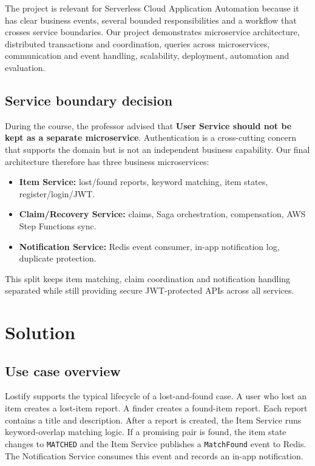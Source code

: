 \documentclass[11pt,a4paper]{article}
\begin{document}
The project is relevant for Serverless Cloud Application Automation because it has clear
business events, several bounded responsibilities and a workflow that crosses service boundaries.
Our project demonstrates microservice architecture, distributed transactions and coordination,
queries across microservices, communication and event handling, scalability, deployment,
automation and evaluation.

\subsection{Service boundary decision}

During the course, the professor advised that \textbf{User Service should not be kept as a separate
microservice}. Authentication is a cross-cutting concern that supports the domain but is not an
independent business capability. Our final architecture therefore has three business microservices:

\begin{itemize}
    \item \textbf{Item Service:} lost/found reports, keyword matching, item states, register/login/JWT.
    \item \textbf{Claim/Recovery Service:} claims, Saga orchestration, compensation, AWS Step Functions sync.
    \item \textbf{Notification Service:} Redis event consumer, in-app notification log, duplicate protection.
\end{itemize}

This split keeps item matching, claim coordination and notification handling separated while
still providing secure JWT-protected APIs across all services.

\section{Solution}

\subsection{Use case overview}

Lostify supports the typical lifecycle of a lost-and-found case. A user who lost an item creates a
lost-item report. A finder creates a found-item report. Each report contains a title and description.
After a report is created, the Item Service runs keyword-overlap matching logic. If a promising pair
is found, the item state changes to \texttt{MATCHED} and the Item Service publishes a \texttt{MatchFound}
event to Redis. The Notification Service consumes this event and records an in-app notification.
\end{document}
